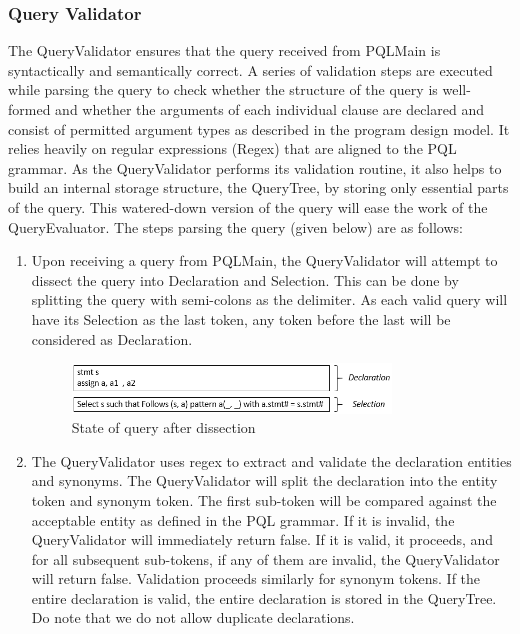 \documentclass[12pt]{article}
\begin{document}
{{{{{{{{{{{{{\subsubsection{Query Validator}
The QueryValidator ensures that the query received from PQLMain is syntactically and semantically correct. A series of validation steps are executed while parsing the query to check whether the structure of the query is well-formed and whether the arguments of each individual clause are declared and consist of permitted argument types as described in the program design model. It relies heavily on regular expressions (Regex) that are aligned to the PQL grammar. As the QueryValidator performs its validation routine, it also helps to build an internal storage structure, the QueryTree, by storing only essential parts of the query. This watered-down version of the query will ease the work of the QueryEvaluator. \newline
The steps parsing the query (given below) are as follows:
\begin{center}
\end{center}
\vspace{4mm}
\begin{enumerate}
\item Upon receiving a query from PQLMain, the QueryValidator will attempt to dissect the query into Declaration and Selection. This can be done by splitting the query with semi-colons as the delimiter. As each valid query will have its Selection as the last token, any token before the last will be considered as Declaration.
\begin{figure}[H]
  \caption{State of query after dissection}
  \centering 
 \includegraphics[width=0.8\textwidth]{DissectedQuery.png}
\end{figure}
\item The QueryValidator uses regex to extract and validate the declaration entities and synonyms. 
The QueryValidator will split the declaration into the entity token and synonym token.
The first sub-token will be compared against the acceptable entity as defined in the PQL grammar. If it is invalid, the QueryValidator will immediately return false. If it is valid, it proceeds, and for all subsequent sub-tokens, if any of them are invalid, the QueryValidator will return false. 
Validation proceeds similarly for synonym tokens.
If the entire declaration is valid, the entire declaration is stored in the QueryTree.
Do note that we do not allow duplicate declarations. 


\end{enumerate}}}}}}}}}}}}}}
\end{document}
